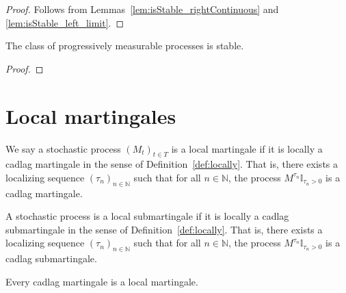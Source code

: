 \begin{proof}
  \leanok
  Follows from Lemmas~\ref{lem:isStable_rightContinuous} and \ref{lem:isStable_left_limit}.
\end{proof}


\begin{lemma}\label{lem:isStable_progMeasurable}
  \leanok
The class of progressively measurable processes is stable.
\end{lemma}

\begin{proof}\leanok
\end{proof}





\section{Local martingales}

\begin{definition}\label{def:IsLocalMartingale}
  \leanok
  We say a stochastic process $(M_t)_{t \in T}$ is a local martingale if it is locally a cadlag martingale in the sense of
  Definition~\ref{def:locally}. That is, there exists a localizing sequence $(\tau_n)_{n \in \mathbb{N}}$ such that for all $n \in \mathbb{N}$, the process $M^{\tau_n}\mathbb{I}_{\tau_n > 0}$ is a cadlag martingale.
\end{definition}


\begin{definition}\label{def:IsLocalSubmartingale}
  \leanok
A stochastic process is a local submartingale if it is locally a cadlag submartingale in the sense of Definition~\ref{def:locally}.
That is, there exists a localizing sequence $(\tau_n)_{n \in \mathbb{N}}$ such that for all $n \in \mathbb{N}$, the process $M^{\tau_n}\mathbb{I}_{\tau_n > 0}$ is a cadlag submartingale.
\end{definition}


\begin{lemma}\label{lem:Martingale.IsLocalMartingale}
  \leanok
Every cadlag martingale is a local martingale.
\end{lemma}

